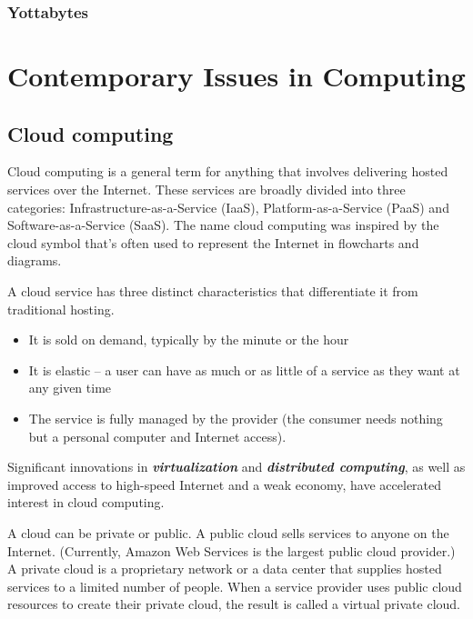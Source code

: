 \subsection{Yottabytes}







\chapter{Contemporary Issues in Computing}
\section{Cloud computing}
Cloud computing is a general term for anything that involves delivering hosted services over the Internet. These services are broadly divided into three categories: Infrastructure-as-a-Service (IaaS), Platform-as-a-Service (PaaS) and Software-as-a-Service (SaaS). The name cloud computing was inspired by the cloud symbol that's often used to represent the Internet in flowcharts and diagrams.


A cloud service has three distinct characteristics that differentiate it from traditional hosting.
\begin{itemize} 
\item It is sold on demand, typically by the minute or the hour 
\item It is elastic -- a user can have as much or as little of a service as they want at any given time
\item The service is fully managed by the provider (the consumer needs nothing but a personal computer and Internet access). 
\end{itemize}

Significant innovations in \textbf{\emph{virtualization}} and \textbf{\emph{distributed computing}}, as well as improved access to high-speed Internet and a weak economy, have accelerated interest in cloud computing.

A cloud can be private or public. A public cloud sells services to anyone on the Internet. (Currently, Amazon Web Services is the largest public cloud provider.) A private cloud is a proprietary network or a data center that supplies hosted services to a limited number of people. When a service provider uses public cloud resources to create their private cloud, the result is called a virtual private cloud. 

